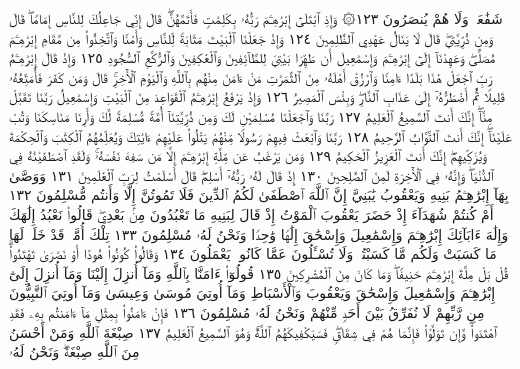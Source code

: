 شَفَٰعَةࣱ وَلَا هُمْ يُنصَرُونَ ١٢٣۞ وَإِذِ ٱبْتَلَىٰٓ إِبْرَٰهِـۧمَ رَبُّهُۥ بِكَلِمَٰتࣲ
فَأَتَمَّهُنَّۖ قَالَ إِنِّي جَاعِلُكَ لِلنَّاسِ إِمَامࣰاۖ قَالَ وَمِن ذُرِّيَّتِيۖ قَالَ
لَا يَنَالُ عَهْدِي ٱلظَّٰلِمِينَ ١٢٤ وَإِذْ جَعَلْنَا ٱلْبَيْتَ مَثَابَةࣰ لِّلنَّاسِ
وَأَمْنࣰا وَٱتَّخِذُوا۟ مِن مَّقَامِ إِبْرَٰهِـۧمَ مُصَلࣰّىۖ وَعَهِدْنَآ إِلَىٰٓ إِبْرَٰهِـۧمَ
وَإِسْمَٰعِيلَ أَن طَهِّرَا بَيْتِيَ لِلطَّآئِفِينَ وَٱلْعَٰكِفِينَ وَٱلرُّكَّعِ ٱلسُّجُودِ ١٢٥
وَإِذْ قَالَ إِبْرَٰهِـۧمُ رَبِّ ٱجْعَلْ هَٰذَا بَلَدًا ءَامِنࣰا وَٱرْزُقْ أَهْلَهُۥ
مِنَ ٱلثَّمَرَٰتِ مَنْ ءَامَنَ مِنْهُم بِٱللَّهِ وَٱلْيَوْمِ ٱلْأٓخِرِۚ قَالَ وَمَن كَفَرَ
فَأُمَتِّعُهُۥ قَلِيلࣰا ثُمَّ أَضْطَرُّهُۥٓ إِلَىٰ عَذَابِ ٱلنَّارِۖ وَبِئْسَ ٱلْمَصِيرُ ١٢٦
وَإِذْ يَرْفَعُ إِبْرَٰهِـۧمُ ٱلْقَوَاعِدَ مِنَ ٱلْبَيْتِ وَإِسْمَٰعِيلُ رَبَّنَا تَقَبَّلْ
مِنَّآۖ إِنَّكَ أَنتَ ٱلسَّمِيعُ ٱلْعَلِيمُ ١٢٧ رَبَّنَا وَٱجْعَلْنَا مُسْلِمَيْنِ
لَكَ وَمِن ذُرِّيَّتِنَآ أُمَّةࣰ مُّسْلِمَةࣰ لَّكَ وَأَرِنَا مَنَاسِكَنَا وَتُبْ عَلَيْنَآۖ
إِنَّكَ أَنتَ ٱلتَّوَّابُ ٱلرَّحِيمُ ١٢٨ رَبَّنَا وَٱبْعَثْ فِيهِمْ رَسُولࣰا مِّنْهُمْ
يَتْلُوا۟ عَلَيْهِمْ ءَايَٰتِكَ وَيُعَلِّمُهُمُ ٱلْكِتَٰبَ وَٱلْحِكْمَةَ
وَيُزَكِّيهِمْۖ إِنَّكَ أَنتَ ٱلْعَزِيزُ ٱلْحَكِيمُ ١٢٩ وَمَن يَرْغَبُ عَن مِّلَّةِ
إِبْرَٰهِـۧمَ إِلَّا مَن سَفِهَ نَفْسَهُۥۚ وَلَقَدِ ٱصْطَفَيْنَٰهُ فِي ٱلدُّنْيَاۖ
وَإِنَّهُۥ فِي ٱلْأٓخِرَةِ لَمِنَ ٱلصَّٰلِحِينَ ١٣٠ إِذْ قَالَ لَهُۥ رَبُّهُۥٓ أَسْلِمْۖ
قَالَ أَسْلَمْتُ لِرَبِّ ٱلْعَٰلَمِينَ ١٣١ وَوَصَّىٰ بِهَآ إِبْرَٰهِـۧمُ بَنِيهِ
وَيَعْقُوبُ يَٰبَنِيَّ إِنَّ ٱللَّهَ ٱصْطَفَىٰ لَكُمُ ٱلدِّينَ فَلَا تَمُوتُنَّ
إِلَّا وَأَنتُم مُّسْلِمُونَ ١٣٢ أَمْ كُنتُمْ شُهَدَآءَ إِذْ حَضَرَ يَعْقُوبَ
ٱلْمَوْتُ إِذْ قَالَ لِبَنِيهِ مَا تَعْبُدُونَ مِنۢ بَعْدِيۖ قَالُوا۟ نَعْبُدُ
إِلَٰهَكَ وَإِلَٰهَ ءَابَآئِكَ إِبْرَٰهِـۧمَ وَإِسْمَٰعِيلَ وَإِسْحَٰقَ إِلَٰهࣰا
وَٰحِدࣰا وَنَحْنُ لَهُۥ مُسْلِمُونَ ١٣٣ تِلْكَ أُمَّةࣱ قَدْ خَلَتْۖ لَهَا مَا كَسَبَتْ
وَلَكُم مَّا كَسَبْتُمْۖ وَلَا تُسْـَٔلُونَ عَمَّا كَانُوا۟ يَعْمَلُونَ ١٣٤
وَقَالُوا۟ كُونُوا۟ هُودًا أَوْ نَصَٰرَىٰ تَهْتَدُوا۟ۗ قُلْ بَلْ مِلَّةَ إِبْرَٰهِـۧمَ
حَنِيفࣰاۖ وَمَا كَانَ مِنَ ٱلْمُشْرِكِينَ ١٣٥ قُولُوٓا۟ ءَامَنَّا بِٱللَّهِ وَمَآ
أُنزِلَ إِلَيْنَا وَمَآ أُنزِلَ إِلَىٰٓ إِبْرَٰهِـۧمَ وَإِسْمَٰعِيلَ وَإِسْحَٰقَ وَيَعْقُوبَ
وَٱلْأَسْبَاطِ وَمَآ أُوتِيَ مُوسَىٰ وَعِيسَىٰ وَمَآ أُوتِيَ ٱلنَّبِيُّونَ مِن
رَّبِّهِمْ لَا نُفَرِّقُ بَيْنَ أَحَدࣲ مِّنْهُمْ وَنَحْنُ لَهُۥ مُسْلِمُونَ ١٣٦
فَإِنْ ءَامَنُوا۟ بِمِثْلِ مَآ ءَامَنتُم بِهِۦ فَقَدِ ٱهْتَدَوا۟ۖ وَّإِن تَوَلَّوْا۟
فَإِنَّمَا هُمْ فِي شِقَاقࣲۖ فَسَيَكْفِيكَهُمُ ٱللَّهُۚ وَهُوَ ٱلسَّمِيعُ ٱلْعَلِيمُ ١٣٧
صِبْغَةَ ٱللَّهِ وَمَنْ أَحْسَنُ مِنَ ٱللَّهِ صِبْغَةࣰۖ وَنَحْنُ لَهُۥ
